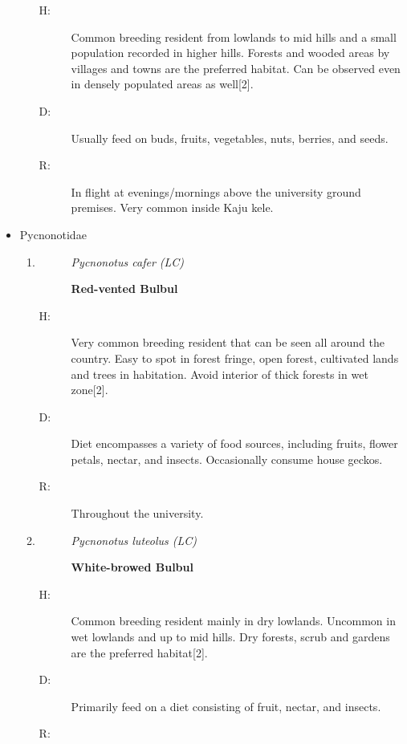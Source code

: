 \begin{itemize}
\begin{enumerate}
\begin{description}%
\item[H: ]%
Common breeding resident from lowlands to mid hills and a small population recorded in higher hills. Forests and wooded areas by villages and towns are the preferred habitat. Can be observed even in densely populated areas as well{[}2{]}.%
\item[D: ]%
Usually feed on buds, fruits, vegetables, nuts, berries, and seeds.%
\item[R: ]%
In flight at evenings/mornings above the university ground premises. Very common inside Kaju kele.%
\end{description}%
\end{enumerate}%
\item%
Pycnonotidae%
\begin{enumerate}%
\item%
\begin{description}%
\item[]%
\textit{Pycnonotus cafer (LC)}%
\item[]%
\textbf{Red{-}vented Bulbul}%
\end{description}%
\begin{description}%
\item[H: ]%
Very common breeding resident that can be seen all around the country. Easy to spot in forest fringe, open forest, cultivated lands and trees in habitation.  Avoid interior of thick forests in wet zone{[}2{]}.%
\item[D: ]%
Diet encompasses a variety of food sources, including fruits, flower petals, nectar, and insects. Occasionally consume house geckos.%
\item[R: ]%
Throughout the university.%
\end{description}%
\item%
\begin{description}%
\item[]%
\textit{Pycnonotus luteolus (LC)}%
\item[]%
\textbf{White{-}browed Bulbul}%
\end{description}%
\begin{description}%
\item[H: ]%
Common breeding resident mainly in dry lowlands. Uncommon in wet lowlands and up to mid hills. Dry forests, scrub and gardens are the preferred habitat{[}2{]}.%
\item[D: ]%
Primarily feed on a diet consisting of fruit, nectar, and insects.%
\item[R: ]%

\end{description}
\end{enumerate}
\end{itemize}
